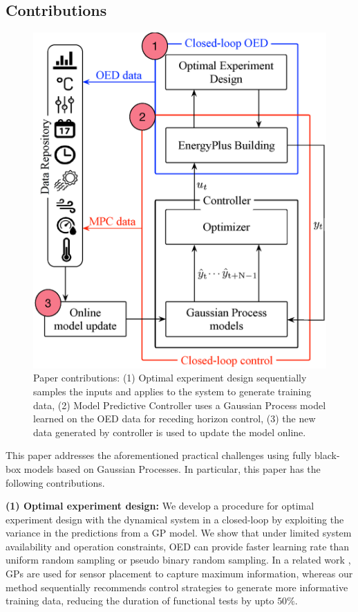 \subsection{Contributions}
\begin{figure}[!t]
	\centering
	\includegraphics[width=0.7\linewidth]{figures/overview.eps}
	\caption{Paper contributions: (1) Optimal experiment design sequentially samples the inputs and applies to the system to generate training data, (2) Model Predictive Controller uses a Gaussian Process model learned on the OED data for receding horizon control, (3) the new data generated by controller is used to update the model online.}
	\captionsetup{justification=centering}
    \vspace{-11pt}
	\label{F:intro}
\end{figure}
This paper addresses the aforementioned practical challenges using fully black-box models based on Gaussian Processes.
In particular, this paper has the following contributions.

\noindent \textbf{(1) Optimal experiment design:} We develop a procedure for optimal experiment design with the dynamical system in a closed-loop by exploiting the variance in the predictions from a GP model. We show that under limited system availability and operation constraints, OED can provide faster learning rate than uniform random sampling or pseudo binary random sampling. In a related work \cite{Krause2008}, GPs are used for sensor placement to capture maximum information, whereas our method sequentially recommends control strategies to generate more informative training data, reducing the duration of functional tests by upto \(50\%\).
	

